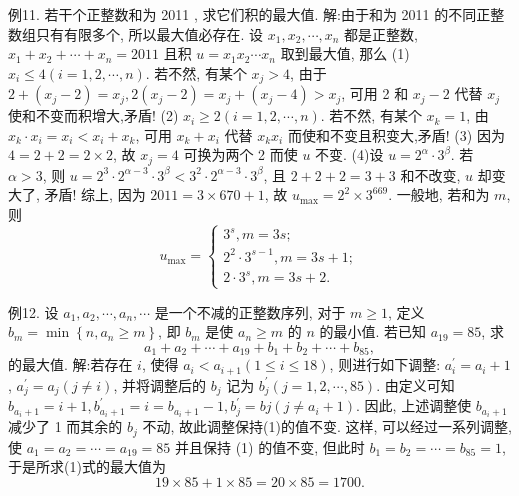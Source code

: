 例11. 若干个正整数和为 2011 , 求它们积的最大值.
解:由于和为 2011 的不同正整数组只有有限多个, 所以最大值必存在.
设 $x_1, x_2, \cdots, x_n$ 都是正整数, $x_1+x_2+\cdots+x_n=2011$ 且积 $u= x_1 x_2 \cdots x_n$ 取到最大值, 那么
(1) $x_i \leqslant 4(i=1,2, \cdots, n)$. 若不然, 有某个 $x_j>4$, 由于 $2+\left(x_j-2\right)= x_j, 2\left(x_j-2\right)=x_j+\left(x_j-4\right)>x_j$, 可用 2 和 $x_j-2$ 代替 $x_j$ 使和不变而积增大,矛盾!
(2) $x_i \geqslant 2(i=1,2, \cdots, n)$. 若不然, 有某个 $x_k=1$, 由 $x_k \cdot x_i=x_i< x_i+x_k$, 可用 $x_k+x_i$ 代替 $x_k x_i$ 而使和不变且积变大,矛盾!
(3) 因为 $4=2+2=2 \times 2$, 故 $x_j=4$ 可换为两个 2 而使 $u$ 不变.
(4)设 $u=2^\alpha \cdot 3^\beta$. 若 $\alpha>3$, 则 $u=2^3 \cdot 2^{\alpha-3} \cdot 3^\beta<3^2 \cdot 2^{\alpha-3} \cdot 3^\beta$, 且 $2+ 2+2=3+3$ 和不改变, $u$ 却变大了, 矛盾!
综上, 因为 $2011=3 \times 670+1$, 故 $u_{\max }=2^2 \times 3^{669}$.
一般地, 若和为 $m$, 则
$$
u_{\max }=\left\{\begin{array}{l}
3^s, m=3 s ; \\
2^2 \cdot 3^{s-1}, m=3 s+1 ; \\
2 \cdot 3^s, m=3 s+2 .
\end{array}\right.
$$



例12. 设 $a_1, a_2, \cdots, a_n, \cdots$ 是一个不减的正整数序列, 对于 $m \geqslant 1$, 定义 $b_m=\min \left\{n, a_n \geqslant m\right\}$, 即 $b_m$ 是使 $a_n \geqslant m$ 的 $n$ 的最小值.
若已知 $a_{19}=85$, 求
$$
a_1+a_2+\cdots+a_{19}+b_1+b_2+\cdots+b_{85}, \label{(1)}
$$
的最大值.
解:若存在 $i$, 使得 $a_i<a_{i+1}(1 \leqslant i \leqslant 18)$, 则进行如下调整: $a_i^{\prime}=a_i+1$, $a_j^{\prime}=a_j(j \neq i)$, 并将调整后的 $b_j$ 记为 $b_j^{\prime}(j=1,2, \cdots, 85)$.
由定义可知 $b_{a_i+1}=i+1, b_{a_i+1}^{\prime}=i=b_{a_i+1}-1, b_j^{\prime}=b j\left(j \neq a_i+1\right)$.
因此, 上述调整使 $b_{a_i+1}$ 减少了 1 而其余的 $b_j$ 不动, 故此调整保持(1)的值不变.
这样, 可以经过一系列调整, 使 $a_1=a_2=\cdots=a_{19}=85$ 并且保持 (1) 的值不变, 但此时 $b_1=b_2=\cdots=b_{85}=1$, 于是所求(1)式的最大值为
$$
19 \times 85+1 \times 85=20 \times 85=1700 .
$$


